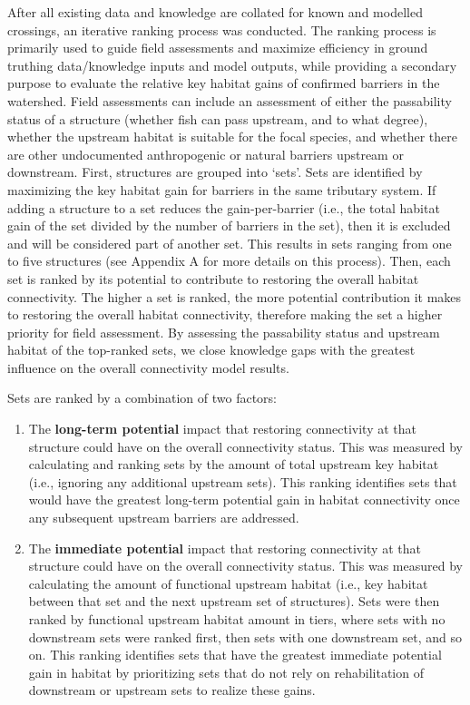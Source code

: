 \documentclass[
  letterpaper,
  DIV=11,
  numbers=noendperiod]{scrreprt}
\begin{document}
After all existing data and knowledge are collated for known and
modelled crossings, an iterative ranking process was conducted. The
ranking process is primarily used to guide field assessments and
maximize efficiency in ground truthing data/knowledge inputs and model
outputs, while providing a secondary purpose to evaluate the relative
key habitat gains of confirmed barriers in the watershed. Field
assessments can include an assessment of either the passability status
of a structure (whether fish can pass upstream, and to what degree),
whether the upstream habitat is suitable for the focal species, and
whether there are other undocumented anthropogenic or natural barriers
upstream or downstream. First, structures are grouped into `sets'. Sets
are identified by maximizing the key habitat gain for barriers in the
same tributary system. If adding a structure to a set reduces the
gain-per-barrier (i.e., the total habitat gain of the set divided by the
number of barriers in the set), then it is excluded and will be
considered part of another set. This results in sets ranging from one to
five structures (see Appendix A for more details on this process). Then,
each set is ranked by its potential to contribute to restoring the
overall habitat connectivity. The higher a set is ranked, the more
potential contribution it makes to restoring the overall habitat
connectivity, therefore making the set a higher priority for field
assessment. By assessing the passability status and upstream habitat of
the top-ranked sets, we close knowledge gaps with the greatest influence
on the overall connectivity model results.

Sets are ranked by a combination of two factors:

\begin{enumerate}
\def\labelenumi{\arabic{enumi}.}
\item
  The \textbf{long-term potential} impact that restoring connectivity at
  that structure could have on the overall connectivity status. This was
  measured by calculating and ranking sets by the amount of total
  upstream key habitat (i.e., ignoring any additional upstream sets).
  This ranking identifies sets that would have the greatest long-term
  potential gain in habitat connectivity once any subsequent upstream
  barriers are addressed.
\item
  The \textbf{immediate potential} impact that restoring connectivity at
  that structure could have on the overall connectivity status. This was
  measured by calculating the amount of functional upstream habitat
  (i.e., key habitat between that set and the next upstream set of
  structures). Sets were then ranked by functional upstream habitat
  amount in tiers, where sets with no downstream sets were ranked first,
  then sets with one downstream set, and so on. This ranking identifies
  sets that have the greatest immediate potential gain in habitat by
  prioritizing sets that do not rely on rehabilitation of downstream or
  upstream sets to realize these gains.
\end{enumerate}
\end{document}
